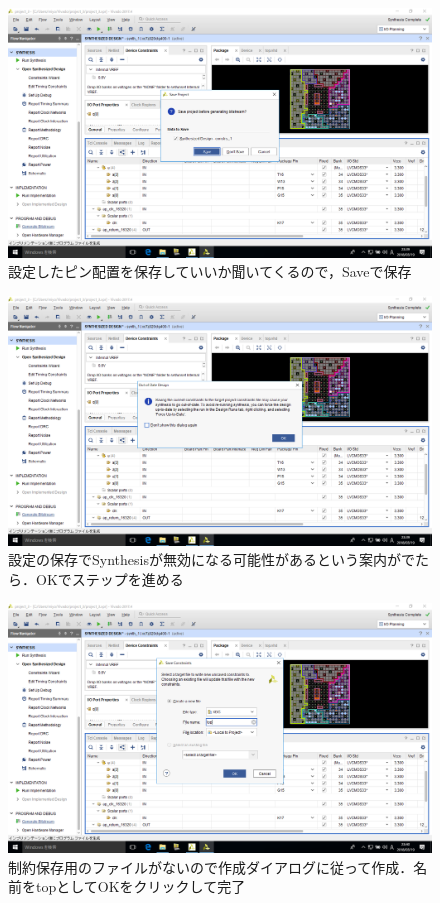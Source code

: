 \documentclass[a4paper,dvipdfmx]{jsarticle}
\begin{document}
 \begin{figure}[H]
  \begin{center}
   \includegraphics[width=.8\textwidth]{chapter08_figures/VirtualBox_Windows10_19_03_2018_23_39_50.png}
  \end{center}
  \caption{設定したピン配置を保存していいか聞いてくるので，Saveで保存}
 \end{figure}

 \begin{figure}[H]
  \begin{center}
   \includegraphics[width=.8\textwidth]{chapter08_figures/VirtualBox_Windows10_19_03_2018_23_39_55.png}
  \end{center}
  \caption{設定の保存でSynthesisが無効になる可能性があるという案内がでたら．OKでステップを進める}
 \end{figure}

 \begin{figure}[H]
  \begin{center}
   \includegraphics[width=.8\textwidth]{chapter08_figures/VirtualBox_Windows10_19_03_2018_23_40_00.png}
  \end{center}
  \caption{制約保存用のファイルがないので作成ダイアログに従って作成．名前をtopとしてOKをクリックして完了}
 \end{figure}
\end{document}
